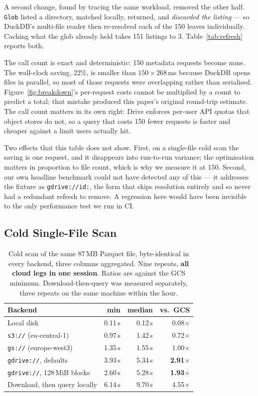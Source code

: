 \documentclass[sigconf, nonacm]{acmart}
\begin{document}
A second change, found by tracing the same workload, removed the other half.
\texttt{Glob} listed a directory, matched locally, returned, and \emph{discarded
the listing} --- so DuckDB's multi-file reader then re-resolved each of the 150
leaves individually. Caching what the glob already held takes 151 listings to
3. Table~\ref{tab:refresh} reports both.

The call count is exact and deterministic: 150 metadata requests become none.
The wall-clock saving, 22\%, is smaller than $150 \times 268$\,ms because
DuckDB opens files in parallel, so most of those requests were overlapping
rather than serialised. Figure~\ref{fig:breakdown}'s per-request costs cannot
be multiplied by a count to predict a total; that mistake produced this
paper's original round-trip estimate. The call count matters in its own right:
Drive enforces per-user API quotas that object stores do not, so a query that
costs 150 fewer requests is faster and cheaper against a limit users actually
hit.

Two effects that this table does not show. First, on a single-file cold scan
the saving is one request, and it disappears into run-to-run variance; the
optimisation matters in proportion to file count, which is why we measure it at
150. Second, our own headline benchmark could not have detected any of this ---
it addresses the fixture as \texttt{gdrive://id:}, the form that skips
resolution entirely and so never had a redundant refresh to remove. A
regression here would have been invisible to the only performance test we run
in CI.

\subsection{Cold Single-File Scan}

\begin{table}[t]
\caption{Cold scan of the same 87\,MB Parquet file, byte-identical in every
backend, three columns aggregated. Nine repeats, \textbf{all cloud legs in one
session}. Ratios are against the GCS minimum. Download-then-query was measured
separately, three repeats on the same machine within the hour.}
\label{tab:coldscan}
\small
\begin{tabular}{lrrr}
\toprule
Backend & min & median & vs.\ GCS \\
\midrule
Local disk                          & 0.11\,s & 0.12\,s & 0.08$\times$ \\
\texttt{s3://} (eu-central-1)       & 0.97\,s & 1.42\,s & 0.72$\times$ \\
\texttt{gs://} (europe-west3)       & 1.35\,s & 1.55\,s & 1.00$\times$ \\
\texttt{gdrive://}, defaults        & 3.93\,s & 5.34\,s & \textbf{2.91$\times$} \\
\texttt{gdrive://}, 128\,MiB blocks & 2.60\,s & 5.28\,s & \textbf{1.93$\times$} \\
\addlinespace
Download, then query locally        & 6.14\,s & 9.70\,s & 4.55$\times$ \\
\bottomrule
\end{tabular}
\end{table}
\end{document}
